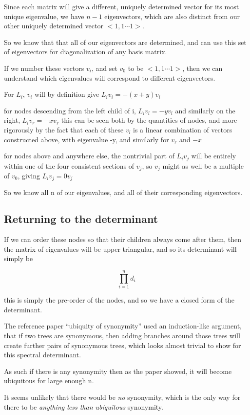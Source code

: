 \documentclass{report}
\begin{document}
Since each matrix will give a different, uniquely determined vector for its
most unique eigenvalue, we have $n-1$ eigenvectors, which are also distinct from
our other uniquely determined vector $<1, 1\cdots 1>$.

So we know that that all of our eigenvectors are determined, and can use this
set of eigenvectors for diagonalization of any basis matrix.


If we number these vectors $v_i$, and set $v_0$ to be $<1, 1\cdots 1>$, then we can
understand which eigenvalues will correspond to different eigenvectors.

For $L_i$, $v_i$ will by definition give $L_i v_i = -(x+y) v_i$

for nodes descending from the left child of i, $L_i v_l = -y v_l$
and similarly on the right, $L_i v_r = -x v_r$
this can be seen both by the quantities of nodes, and more rigorously by the
fact that each of these $v_l$ is a linear combination of vectors constructed
above, with eigenvalue -y, and similarly for $v_r$ and $-x$

for nodes above and anywhere else, the nontrivial part of $L_i v_j$ will be
entirely within one of the four consistent sections of $v_j$, so $v_j$ might as
well be a multiple of $v_0$, giving $L_i v_j = 0 v_j$

So we know all n of our eigenvalues, and all of their corresponding
eigenvectors.


\subsection{Returning to the determinant}


If we can order these nodes so that their children always come after them, then
the matrix of eigenvalues will be upper triangular, and so its determinant will
simply be

\[\prod_{i=1}^n d_i\]

this is simply the pre-order of the nodes, and so we have a closed form of the
determinant.

The reference paper ``ubiquity of synonymity'' used an induction-like argument,
that if two trees are synonymous, then adding branches around those trees will
create further pairs of synonymous trees, which looks almost trivial to show
for this spectral determinant.

As such if there is any synonymity then as the paper showed, it will become
ubiquitous for large enough n.

It seems unlikely that there would be \emph{no} synonymity, which is the only way
for there to be \emph{anything less than ubiquitous} synonymity.
\end{document}
